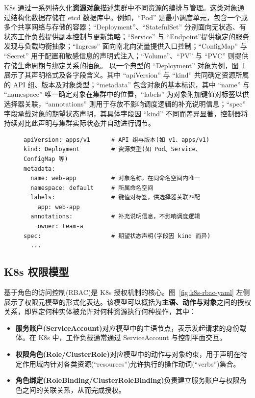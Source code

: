 K8s 通过一系列持久化\textbf{资源对象}描述集群中不同资源的编排与管理。这类对象通过结构化数据存储在 etcd 数据库中。例如，“Pod” 是最小调度单元，包含一个或多个共享网络与存储的容器；“Deployment”、“StatefulSet” 分别面向无状态、有状态工作负载提供副本控制与更新策略；“Service” 与 “Endpoint”提供稳定的服务发现与负载均衡抽象；“Ingress” 面向南北向流量提供入口控制；“ConfigMap” 与 “Secret” 用于配置和敏感信息的声明式注入；“Volume”、“PV” 与 “PVC” 则提供存储生命周期与绑定关系的抽象。
以一个典型的 “Deployment” 对象为例，图~\ref{fig:k8s-deployment-yaml} 展示了其声明格式及各字段含义。其中 “apiVersion” 与 “kind” 共同确定资源所属的 API 组、版本及对象类型；“metadata” 包含对象的基本标识，其中 “name” 与 “namespace” 唯一确定对象在集群中的位置，“labels” 为对象附加键值对标签以供选择器关联，“annotations” 则用于存放不影响调度逻辑的补充说明信息；“spec” 字段承载对象的期望状态声明，其具体字段因 “kind” 不同而差异显著，控制器将持续对比此声明与集群实际状态并自动进行调节。
\begin{figure}[htb]
    \centering
    \setlength{\abovecaptionskip}{3pt}
    \setlength{\belowcaptionskip}{0pt}
    \begin{tcolorbox}[enhanced,colback=gray!3,colframe=gray!55,boxrule=0.4pt,arc=1mm,left=2mm,right=2mm,top=0.5mm,bottom=0.5mm]
    \begin{BVerbatim}[fontsize=\small,baselinestretch=0.75]
apiVersion: apps/v1      # API 组与版本(如 v1、apps/v1)
kind: Deployment         # 资源类型(如 Pod、Service、ConfigMap 等)
metadata:
  name: web-app          # 对象名称，在同命名空间内唯一
  namespace: default     # 所属命名空间
  labels:                # 键值对标签，供选择器关联匹配
    app: web-app
  annotations:           # 补充说明信息，不影响调度逻辑
    owner: team-a
spec:                    # 期望状态声明(字段因 kind 而异)
  ...
    \end{BVerbatim}
    \end{tcolorbox}
    \label{fig:k8s-deployment-yaml}
\end{figure}




\subsection{K8s 权限模型}
基于角色的访问控制(RBAC)是 K8s 授权机制的核心\cite{kubernetes2024}。图~\ref{fig:k8s-rbac-yaml} 左侧展示了权限元模型的形式化表达。该模型可以概括为\textbf{主语、动作与对象}之间的授权关系，即界定何种实体被允许对何种资源执行何种操作，其中：
\begin{itemize}
    \item \textbf{服务账户(ServiceAccount)}对应模型中的主语节点，表示发起请求的身份载体。在 K8s 中，工作负载通常通过 ServiceAccount 与控制平面交互。
    \item \textbf{权限角色(Role/ClusterRole)}对应模型中的动作与对象约束，用于声明在特定作用域内针对各类资源(“resources”)允许执行的操作动词(“verbs”)集合。
    \item \textbf{角色绑定(RoleBinding/ClusterRoleBinding)}负责建立服务账户与权限角色之间的关联关系，从而完成授权。
\end{itemize}

